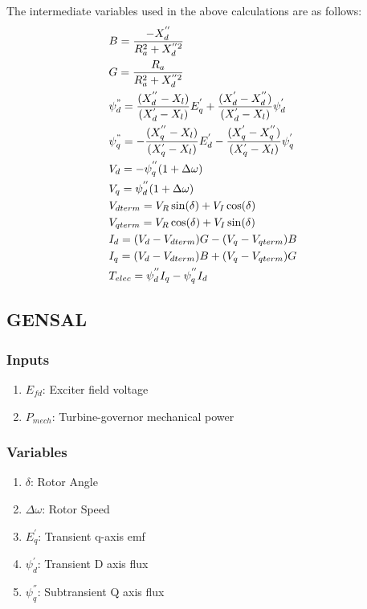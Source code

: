 \documentclass[12pt]{article}
\newcommand{\dw}{\Delta\omega}
\begin{document}
The intermediate variables used in the above calculations are as follows:
\begin{align*}
  &B = \dfrac{-X^{''}_d}{R^2_a + X^{''2}_d}&\\
 &G = \dfrac{R_a}{R^2_a+X^{''2}_d}&\\
 &\psi^{"}_{d}=\dfrac{(X^{''}_d-X_l)}{(X^{'}_d-X_l)}E^{'}_q + \dfrac{(X^{'}_d-X^{''}_d)}{(X^{'}_d-X_l)}\psi^{'}_d&\\
 &\psi^{"}_{q}=-\dfrac{(X^{''}_q-X_l)}{(X^{'}_q-X_l)}E^{'}_d - \dfrac{(X^{'}_q-X^{''}_q)}{(X^{'}_q-X_l)}\psi^{'}_q&\\
  &V_d=-\psi^{''}_{q}(1+{\Delta\omega})&\\
  &V_q=\psi^{''}_{d}(1+{\dw})&\\
  &V_{dterm} = V_R\sin({\delta})+V_I\cos({\delta})&\\
  &V_{qterm} = V_R\cos({\delta})+V_I\sin({\delta})&\\
  &I_d = (V_d-V_{dterm})G-(V_q-V_{qterm})B&\\
  &I_q = (V_d-V_{dterm})B+(V_q-V_{qterm})G& \\
   &T_{elec}=\psi^{''}_{d}I_q-\psi^{''}_{q}I_d&
  \end{align*}


\subsection{GENSAL}

\subsubsection{Inputs}

\begin{enumerate}
	\item $E_{fd}$: Exciter field voltage
	\item $P_{mech}$: Turbine-governor mechanical power
\end{enumerate}

\subsubsection{Variables}
\begin{enumerate}
  \item ${\delta}$: Rotor Angle
  \item ${\dw}$: Rotor Speed 
  \item $E^{'}_q$: Transient q-axis emf
  \item $\psi^{'}_d$: Transient D axis flux
  \item $\psi^{''}_q$: Subtransient Q axis flux 
\end{enumerate}
\end{document}
